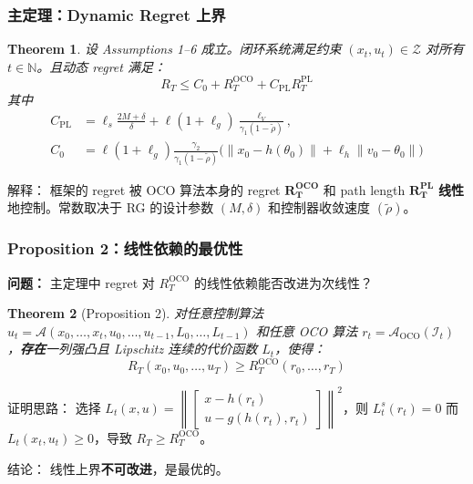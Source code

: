 \documentclass{ltx-talk}
\newtheorem*{theorem}{Theorem}
\begin{document}
\begin{frame}
\frametitle{主定理：Dynamic Regret 上界}

\begin{theorem}
设 Assumptions 1--6 成立。闭环系统满足约束 $(x_t, u_t) \in \mathcal{Z}$ 对所有 $t \in \mathbb{N}$。且动态 regret 满足：
\[
    \boxed{R_T \le C_0 + R_T^{\text{OCO}} + C_{\text{PL}} R_T^{\text{PL}}}
\]
其中
\begin{align*}
    C_{\text{PL}} &= \ell_s\frac{2M + \delta}{\delta} + \ell(1+\ell_g)\frac{\ell_V}{\gamma_1(1-\tilde{\rho})}, \\[4pt]
    C_0 &= \ell(1+\ell_g)\frac{\gamma_2}{\gamma_1(1-\tilde{\rho})}\bigl(\|x_0 - h(\theta_0)\| + \ell_h\|v_0 - \theta_0\|\bigr)
\end{align*}
\end{theorem}

\small
\textcolor{myblue}{解释：} 框架的 regret 被 OCO 算法本身的 regret $\mathbf{R_T^{\text{OCO}}}$ 和 path length $\mathbf{R_T^{\text{PL}}}$ \textbf{线性}地控制。常数取决于 RG 的设计参数 $(M,\delta)$ 和控制器收敛速度 $(\tilde{\rho})$。
\end{frame}

\begin{frame}
\frametitle{Proposition 2：线性依赖的\textcolor{myred}{最优性}}

\textbf{问题：} 主定理中 regret 对 $R_T^{\text{OCO}}$ 的线性依赖能否改进为次线性？

\begin{theorem}[Proposition 2]
对任意控制算法 $u_t = \mathcal{A}(x_0,\dots,x_t, u_0,\dots,u_{t-1}, L_0,\dots,L_{t-1})$ 和任意 OCO 算法 $r_t = \mathcal{A}_{\text{OCO}}(\mathcal{I}_t)$，\textbf{存在}一列强凸且 Lipschitz 连续的代价函数 $L_t$，使得：
\[
    R_T(x_0, u_0, \dots, u_T) \ge R_T^{\text{OCO}}(r_0, \dots, r_T)
\]
\end{theorem}

\textcolor{myblue}{证明思路：} 选择 $L_t(x, u) = \left\|\begin{bmatrix} x - h(r_t) \\ u - g(h(r_t), r_t) \end{bmatrix}\right\|^2$，则 $L_t^s(r_t) = 0$ 而 $L_t(x_t, u_t) \ge 0$，导致 $R_T \ge R_T^{\text{OCO}}$。

\vspace{2mm}
\textcolor{myred}{结论：} 线性上界\textbf{不可改进}，是最优的。
\end{frame}
\end{document}

